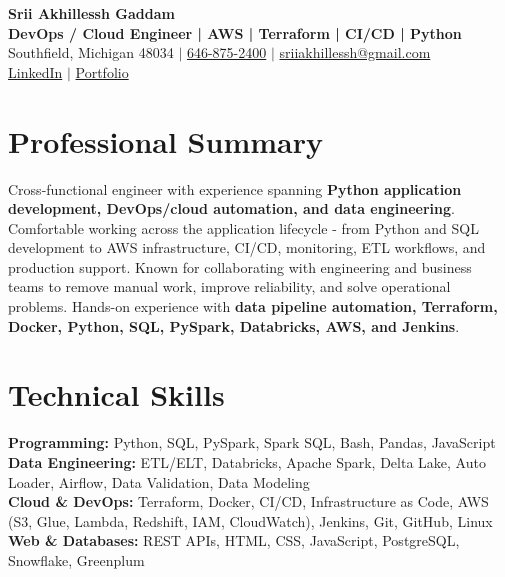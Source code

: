 \documentclass[letterpaper,10pt]{article}
\begin{document}
\fontsize{9.35pt}{10.45pt}\selectfont

\begin{center}
    {\LARGE \textbf{Srii Akhillessh Gaddam}} \\[-1pt]
    \textbf{DevOps / Cloud Engineer | AWS | Terraform | CI/CD | Python} \\[2pt]
    Southfield, Michigan 48034 $|$
    \href{tel:6468752400}{646-875-2400} $|$
    \href{mailto:sriiakhillessh@gmail.com}{sriiakhillessh@gmail.com} \\[1pt]
    \href{https://www.linkedin.com/in/srii-akhiilessh-gaddam-b48668191/}{LinkedIn} $|$
    \href{https://sriiakhillesshg.github.io/portfolio/}{Portfolio}
\end{center}
\vspace{-8pt}

\section{Professional Summary}
\small{Cross-functional engineer with experience spanning \textbf{Python application development, DevOps/cloud automation, and data engineering}. Comfortable working across the application lifecycle - from Python and SQL development to AWS infrastructure, CI/CD, monitoring, ETL workflows, and production support. Known for collaborating with engineering and business teams to remove manual work, improve reliability, and solve operational problems. Hands-on experience with \textbf{data pipeline automation, Terraform, Docker, Python, SQL, PySpark, Databricks, AWS, and Jenkins}.}

\section{Technical Skills}
\small{
\textbf{Programming:} Python, SQL, PySpark, Spark SQL, Bash, Pandas, JavaScript \\
\textbf{Data Engineering:} ETL/ELT, Databricks, Apache Spark, Delta Lake, Auto Loader, Airflow, Data Validation, Data Modeling \\
\textbf{Cloud \& DevOps:} Terraform, Docker, CI/CD, Infrastructure as Code, AWS (S3, Glue, Lambda, Redshift, IAM, CloudWatch), Jenkins, Git, GitHub, Linux \\
\textbf{Web \& Databases:} REST APIs, HTML, CSS, JavaScript, PostgreSQL, Snowflake, Greenplum
}
\end{document}
